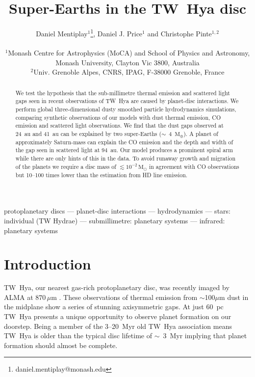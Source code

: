 \documentclass[usenatbib,a4paper,times]{mnras}
\title[Super-Earths in the TW~Hya disc]{Super-Earths in the TW~Hya disc}
\author[Mentiplay, Price \& Pinte]{\parbox{\textwidth}{Daniel
   Mentiplay$^{1}$\thanks{daniel.mentiplay@monash.edu}, Daniel J. Price$^{1}$
   and Christophe Pinte$^{1,2}$}\\
   $^{1}$Monash Centre for Astrophysics (MoCA) and School of Physics and
   Astronomy, Monash University, Clayton Vic 3800, Australia \\
   $^{2}$Univ. Grenoble Alpes, CNRS, IPAG, F-38000 Grenoble, France}
\date{}
\renewcommand{\sun}{\mathrm{M}_{\odot}}
\renewcommand{\earth}{\mathrm{M}_{\oplus}}
\begin{document}
\label{firstpage}

\maketitle


\begin{abstract}

We test the hypothesis that the sub-millimetre thermal emission and scattered
light gaps seen in recent observations of TW~Hya are caused by planet-disc
interactions. We perform global three-dimensional dusty smoothed particle
hydrodynamics simulations, comparing synthetic observations of our models with
dust thermal emission, CO emission and scattered light observations.  We find
that the dust gaps observed at 24~au and 41~au can be explained by two
super-Earths ($\sim$~4~$\earth{}$). A planet of approximately Saturn-mass can
explain the CO emission and the depth and width of the gap seen in scattered
light at 94~au. Our model produces a prominent spiral arm while there are only
hints of this in the data. To avoid runaway growth and migration of the planets
we require a disc mass of $\lesssim 10^{-2}\,\sun{}$ in agreement with CO
observations but 10--100 times lower than the estimation from HD line emission.

\end{abstract}



\begin{keywords}
protoplanetary discs --- planet-disc interactions --- hydrodynamics ---  stars:
individual (TW Hydrae) --- submillimetre: planetary systems --- infrared:
planetary systems %
\end{keywords}










\section{Introduction}

TW~Hya, our nearest gas-rich protoplanetary disc, was recently imaged by ALMA at
$870\,\mu$m \citep{andrews:2016}. These observations of thermal emission from
$\sim$100$\mu$m dust in the midplane show a series of stunning axisymmetric
gaps. At just $60$~pc \citep{gaia-collaboration:2018} TW~Hya presents a unique
opportunity to observe planet formation on our doorstep. Being a member of the
3--20~Myr old \citep{barrado-y-navascues:2006} TW~Hya association means TW~Hya
is older than the typical disc lifetime of $\sim$~3~Myr \citep{haisch:2001}
implying that planet formation should almost be complete.
\end{document}
